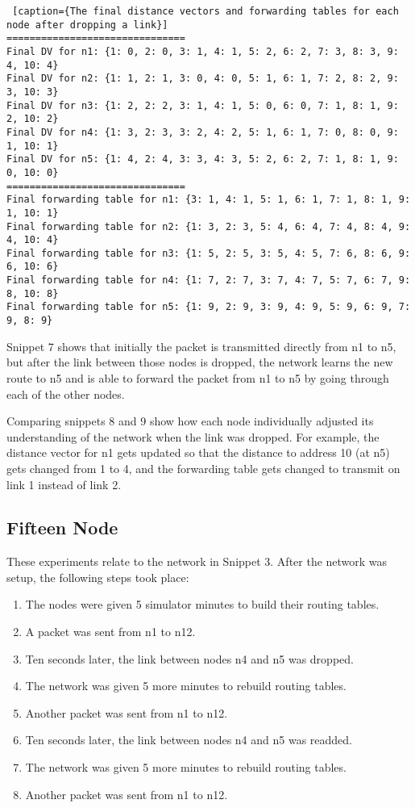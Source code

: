 \documentclass[11pt]{article}
\begin{document}
 \begin{lstlisting} [caption={The final distance vectors and forwarding tables for each node after dropping a link}]
===============================
Final DV for n1: {1: 0, 2: 0, 3: 1, 4: 1, 5: 2, 6: 2, 7: 3, 8: 3, 9: 4, 10: 4}
Final DV for n2: {1: 1, 2: 1, 3: 0, 4: 0, 5: 1, 6: 1, 7: 2, 8: 2, 9: 3, 10: 3}
Final DV for n3: {1: 2, 2: 2, 3: 1, 4: 1, 5: 0, 6: 0, 7: 1, 8: 1, 9: 2, 10: 2}
Final DV for n4: {1: 3, 2: 3, 3: 2, 4: 2, 5: 1, 6: 1, 7: 0, 8: 0, 9: 1, 10: 1}
Final DV for n5: {1: 4, 2: 4, 3: 3, 4: 3, 5: 2, 6: 2, 7: 1, 8: 1, 9: 0, 10: 0}
===============================
Final forwarding table for n1: {3: 1, 4: 1, 5: 1, 6: 1, 7: 1, 8: 1, 9: 1, 10: 1}
Final forwarding table for n2: {1: 3, 2: 3, 5: 4, 6: 4, 7: 4, 8: 4, 9: 4, 10: 4}
Final forwarding table for n3: {1: 5, 2: 5, 3: 5, 4: 5, 7: 6, 8: 6, 9: 6, 10: 6}
Final forwarding table for n4: {1: 7, 2: 7, 3: 7, 4: 7, 5: 7, 6: 7, 9: 8, 10: 8}
Final forwarding table for n5: {1: 9, 2: 9, 3: 9, 4: 9, 5: 9, 6: 9, 7: 9, 8: 9}
 \end{lstlisting}
 
Snippet 7 shows that initially the packet is transmitted directly from n1 to n5, but after the link between those nodes is dropped, the network learns the new route to n5 and is able to forward the packet from n1 to n5 by going through each of the other nodes.

Comparing snippets 8 and 9 show how each node individually adjusted its understanding of the network when the link was dropped. For example, the distance vector for n1 gets updated so that the distance to address 10 (at n5) gets changed from 1 to 4, and the forwarding table gets changed to transmit on link 1 instead of link 2.


\subsection{Fifteen Node}

These experiments relate to the network in Snippet 3. After the network was setup, the following steps took place:

\begin{enumerate}
  \item The nodes were given 5 simulator minutes to build their routing tables.
  \item A packet was sent from n1 to n12.
  \item Ten seconds later, the link between nodes n4 and n5 was dropped.
  \item The network was given 5 more minutes to rebuild routing tables.
  \item Another packet was sent from n1 to n12.
  \item Ten seconds later, the link between nodes n4 and n5 was readded.
  \item The network was given 5 more minutes to rebuild routing tables.
  \item Another packet was sent from n1 to n12.
\end{enumerate}
\end{document}
